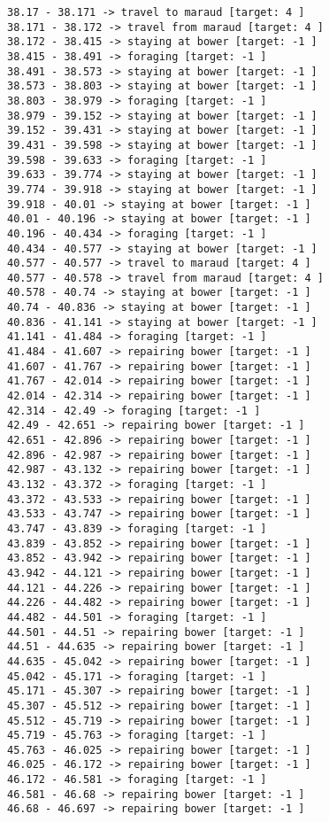 \documentclass[11pt]{article}
\begin{document}
\begin{Verbatim}[commandchars=\\\{\}]
38.17 - 38.171 -> travel to maraud [target: 4 ]
38.171 - 38.172 -> travel from maraud [target: 4 ]
38.172 - 38.415 -> staying at bower [target: -1 ]
38.415 - 38.491 -> foraging [target: -1 ]
38.491 - 38.573 -> staying at bower [target: -1 ]
38.573 - 38.803 -> staying at bower [target: -1 ]
38.803 - 38.979 -> foraging [target: -1 ]
38.979 - 39.152 -> staying at bower [target: -1 ]
39.152 - 39.431 -> staying at bower [target: -1 ]
39.431 - 39.598 -> staying at bower [target: -1 ]
39.598 - 39.633 -> foraging [target: -1 ]
39.633 - 39.774 -> staying at bower [target: -1 ]
39.774 - 39.918 -> staying at bower [target: -1 ]
39.918 - 40.01 -> staying at bower [target: -1 ]
40.01 - 40.196 -> staying at bower [target: -1 ]
40.196 - 40.434 -> foraging [target: -1 ]
40.434 - 40.577 -> staying at bower [target: -1 ]
40.577 - 40.577 -> travel to maraud [target: 4 ]
40.577 - 40.578 -> travel from maraud [target: 4 ]
40.578 - 40.74 -> staying at bower [target: -1 ]
40.74 - 40.836 -> staying at bower [target: -1 ]
40.836 - 41.141 -> staying at bower [target: -1 ]
41.141 - 41.484 -> foraging [target: -1 ]
41.484 - 41.607 -> repairing bower [target: -1 ]
41.607 - 41.767 -> repairing bower [target: -1 ]
41.767 - 42.014 -> repairing bower [target: -1 ]
42.014 - 42.314 -> repairing bower [target: -1 ]
42.314 - 42.49 -> foraging [target: -1 ]
42.49 - 42.651 -> repairing bower [target: -1 ]
42.651 - 42.896 -> repairing bower [target: -1 ]
42.896 - 42.987 -> repairing bower [target: -1 ]
42.987 - 43.132 -> repairing bower [target: -1 ]
43.132 - 43.372 -> foraging [target: -1 ]
43.372 - 43.533 -> repairing bower [target: -1 ]
43.533 - 43.747 -> repairing bower [target: -1 ]
43.747 - 43.839 -> foraging [target: -1 ]
43.839 - 43.852 -> repairing bower [target: -1 ]
43.852 - 43.942 -> repairing bower [target: -1 ]
43.942 - 44.121 -> repairing bower [target: -1 ]
44.121 - 44.226 -> repairing bower [target: -1 ]
44.226 - 44.482 -> repairing bower [target: -1 ]
44.482 - 44.501 -> foraging [target: -1 ]
44.501 - 44.51 -> repairing bower [target: -1 ]
44.51 - 44.635 -> repairing bower [target: -1 ]
44.635 - 45.042 -> repairing bower [target: -1 ]
45.042 - 45.171 -> foraging [target: -1 ]
45.171 - 45.307 -> repairing bower [target: -1 ]
45.307 - 45.512 -> repairing bower [target: -1 ]
45.512 - 45.719 -> repairing bower [target: -1 ]
45.719 - 45.763 -> foraging [target: -1 ]
45.763 - 46.025 -> repairing bower [target: -1 ]
46.025 - 46.172 -> repairing bower [target: -1 ]
46.172 - 46.581 -> foraging [target: -1 ]
46.581 - 46.68 -> repairing bower [target: -1 ]
46.68 - 46.697 -> repairing bower [target: -1 ]

\end{Verbatim}
\end{document}
